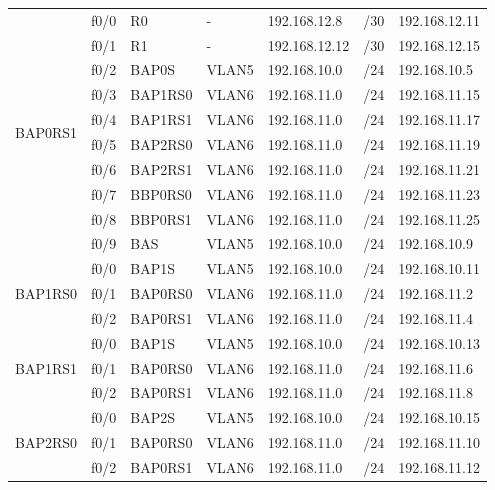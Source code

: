 \documentclass[12pt,a4paper,titlepage]{article}
\begin{document}
{\begin{longtable}{|c|l|l|l|l|c|l|}
    \multirow{10}{*}{BAP0RS1}
    & f0/0 & R0      & -  & 192.168.12.8 & /30 & 192.168.12.11
 \\
    \cline{2-7}
    & f0/1 & R1      & -  & 192.168.12.12 & /30 & 192.168.12.15
 \\
    \cline{2-7}
    & f0/2 & BAP0S   & VLAN5 & 192.168.10.0 & /24 & 192.168.10.5
 \\
    \cline{2-7}
    & f0/3 & BAP1RS0 & VLAN6  & 192.168.11.0 & /24 & 192.168.11.15
 \\
    \cline{2-7}
    & f0/4 & BAP1RS1 & VLAN6  & 192.168.11.0 & /24 & 192.168.11.17
 \\
    \cline{2-7}
    & f0/5 & BAP2RS0 & VLAN6  & 192.168.11.0 & /24 & 192.168.11.19
 \\
    \cline{2-7}
    & f0/6 & BAP2RS1 & VLAN6  & 192.168.11.0 & /24 & 192.168.11.21
 \\
    \cline{2-7}
    & f0/7 & BBP0RS0 & VLAN6  & 192.168.11.0 & /24 & 192.168.11.23
 \\
    \cline{2-7}
    & f0/8 & BBP0RS1 & VLAN6  & 192.168.11.0 & /24 & 192.168.11.25
 \\
    \cline{2-7}
    & f0/9 & BAS     & VLAN5 & 192.168.10.0 & /24 & 192.168.10.9
 \\
    \hline
    
    \multirow{3}{*}{BAP1RS0}
    & f0/0 & BAP1S & VLAN5 & 192.168.10.0 & /24 & 192.168.10.11
 \\
    \cline{2-7}
    & f0/1 & BAP0RS0 & VLAN6  & 192.168.11.0 & /24 & 192.168.11.2
 \\
    \cline{2-7}
    & f0/2 & BAP0RS1 & VLAN6  & 192.168.11.0 & /24 & 192.168.11.4
 \\
    \hline
    
    \multirow{3}{*}{BAP1RS1}
    & f0/0 & BAP1S & VLAN5 & 192.168.10.0 & /24 & 192.168.10.13
 \\
    \cline{2-7}
    & f0/1 & BAP0RS0 & VLAN6  & 192.168.11.0 & /24 & 192.168.11.6
 \\
    \cline{2-7}
    & f0/2 & BAP0RS1 & VLAN6  & 192.168.11.0 & /24 & 192.168.11.8
 \\
    \hline
    
    \multirow{3}{*}{BAP2RS0}
    & f0/0 & BAP2S & VLAN5 & 192.168.10.0 & /24 & 192.168.10.15
 \\
    \cline{2-7}
    & f0/1 & BAP0RS0 & VLAN6  & 192.168.11.0 & /24 & 192.168.11.10
 \\
    \cline{2-7}
    & f0/2 & BAP0RS1 & VLAN6  & 192.168.11.0 & /24 & 192.168.11.12
 \\
    \hline
    

\end{longtable}}
\end{document}
